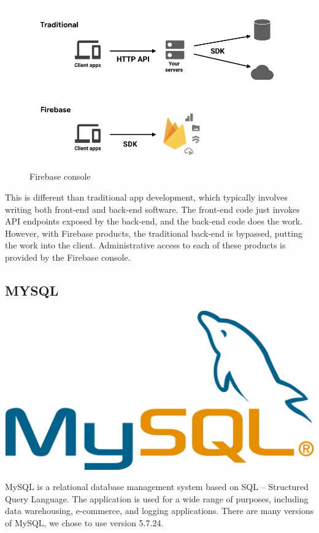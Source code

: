 \documentclass[a4paper,12pt]{report}
\begin{document}
\begin{figure}[h]
    \begin{center}
    \includegraphics[scale=.5]{images/firebaseDiagram.png}
    \caption{Firebase console}
    \label{fig:firbase}
    \end{center}
\end{figure}

This is different than traditional app development, which typically involves writing both front-end and back-end software. The front-end code just invokes API endpoints exposed by the back-end, and the back-end code does the work. However, with Firebase products, the traditional back-end is bypassed, putting the work into the client. Administrative access to each of these products is provided by the Firebase console.

\subsection{MYSQL}
\includegraphics[scale=.04]{images/mysql.png}

MySQL is a relational database management system based on SQL – Structured Query Language. The application is used for a wide range of purposes, including data warehousing, e-commerce, and logging applications. There are many versions of MySQL, we chose to use version 5.7.24.
\end{document}
